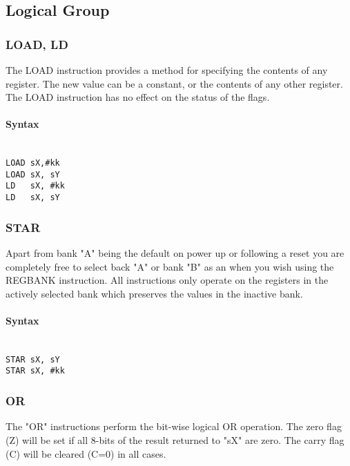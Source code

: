     \subsection{Logical Group}
        \subsubsection{LOAD, LD}
            The LOAD instruction provides a method for specifying the contents of any register. The new value can be a constant, or the contents of any other register. The LOAD instruction has no effect on the status of the flags.

            \paragraph{Syntax}
                ~\\
                \verb'LOAD sX,#kk'\\
                \verb'LOAD sX, sY'\\
                \verb'LD   sX, #kk'\\
                \verb'LD   sX, sY'

        \subsubsection{STAR}
            Apart from bank "A" being the default on power up or following a reset you are completely free to select back "A" or bank "B" as an when you wish using the REGBANK instruction. All instructions only operate on the registers in the actively selected bank which preserves the values in the inactive bank.

            \paragraph{Syntax}
                ~\\
                \verb'STAR sX, sY'\\
                \verb'STAR sX, #kk'

        \subsubsection{OR}
            The "OR" instructions perform the bit-wise logical OR operation. The zero flag (Z) will be set if all 8-bits of the result returned to "sX" are zero. The carry flag (C) will be cleared (C=0) in all cases.

